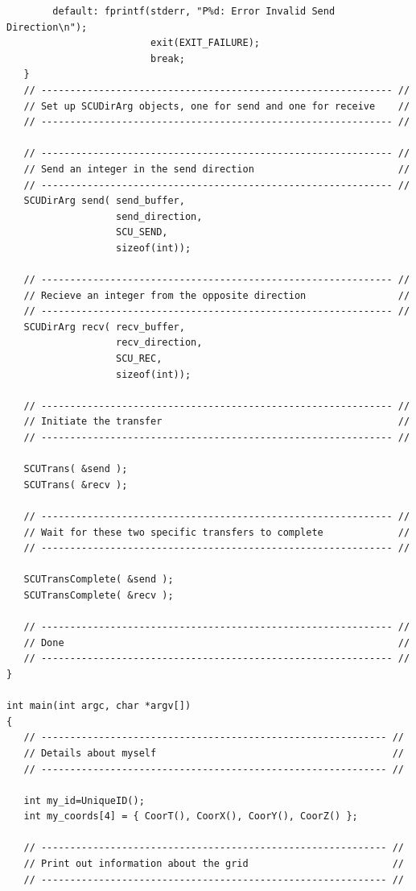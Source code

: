 {\begin{verbatim}
        default: fprintf(stderr, "P%d: Error Invalid Send Direction\n");
                         exit(EXIT_FAILURE);
                         break;
   }
   // ------------------------------------------------------------- //
   // Set up SCUDirArg objects, one for send and one for receive    //
   // ------------------------------------------------------------- //

   // ------------------------------------------------------------- //
   // Send an integer in the send direction                         //
   // ------------------------------------------------------------- //
   SCUDirArg send( send_buffer,
                   send_direction,
                   SCU_SEND,
                   sizeof(int));

   // ------------------------------------------------------------- //
   // Recieve an integer from the opposite direction                //
   // ------------------------------------------------------------- //
   SCUDirArg recv( recv_buffer,
                   recv_direction,
                   SCU_REC,
                   sizeof(int));

   // ------------------------------------------------------------- //
   // Initiate the transfer                                         //
   // ------------------------------------------------------------- //

   SCUTrans( &send );
   SCUTrans( &recv );

   // ------------------------------------------------------------- //
   // Wait for these two specific transfers to complete             //
   // ------------------------------------------------------------- //

   SCUTransComplete( &send );
   SCUTransComplete( &recv );

   // ------------------------------------------------------------- //
   // Done                                                          //
   // ------------------------------------------------------------- //
}

int main(int argc, char *argv[])
{
   // ------------------------------------------------------------ //
   // Details about myself                                         //
   // ------------------------------------------------------------ //

   int my_id=UniqueID();
   int my_coords[4] = { CoorT(), CoorX(), CoorY(), CoorZ() };

   // ------------------------------------------------------------ //
   // Print out information about the grid                         //
   // ------------------------------------------------------------ //


\end{verbatim}}
